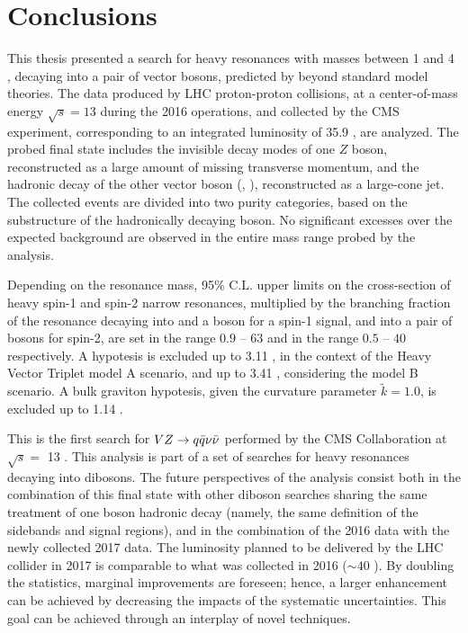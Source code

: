 \chapter{Conclusions}
\label{ch:conclusion}

This thesis presented a search for heavy resonances with masses between 1 \TeV and 4 \TeV, decaying into a pair of vector bosons, predicted by beyond standard model theories. The data produced by LHC proton-proton collisions, at a center-of-mass energy $\sqrt{s}=13$ \TeV during the 2016 operations, and collected by the CMS experiment, corresponding to an integrated luminosity of 35.9 \fbinv, are analyzed. The probed final state includes the invisible decay modes of one $Z$ boson, reconstructed as a large amount of missing transverse momentum, and the hadronic decay of the other vector boson (\Z, \W), reconstructed as a large-cone jet. The collected events are divided into two purity categories, based on the substructure of the hadronically decaying \V boson. No significant excesses over the expected background are observed in the entire mass range probed by the analysis.

\noindent Depending on the resonance mass, 95\% C.L. upper limits on the cross-section of heavy spin-1 and spin-2 narrow resonances, multiplied by the branching fraction of the resonance decaying into \Z and a \W boson for a spin-1 signal, and into a pair of \Z bosons for spin-2, are set in the range $0.9$ -- $63$ \fb and in the range $0.5$ -- $40$ \fb respectively. A \Wp hypotesis is excluded up to 3.11 \TeV, in the context of the Heavy Vector Triplet model A scenario, and up to 3.41 \TeV, considering the model B scenario. A bulk graviton hypotesis, given the curvature parameter $\tilde{k}=1.0$, is excluded up to 1.14 \TeV.

\vspace*{1\baselineskip}

\noindent This is the first search for $VZ \rightarrow q \bar{q} \nu \bar{\nu}$ performed by the CMS Collaboration at $\sqrt{s} = $ 13 \TeV. This analysis is part of a set of searches for heavy resonances decaying into dibosons. The future perspectives of the analysis consist both in the combination of this final state with other diboson searches sharing the same treatment of one boson hadronic decay (namely, the same definition of the sidebands and signal regions), and in the combination of the 2016 data with the newly collected 2017 data. The luminosity planned to be delivered by the LHC collider in 2017 is comparable to what was collected in 2016 ($\sim 40$ \fbinv). By doubling the statistics, marginal improvements are foreseen; hence, a larger enhancement can be achieved by decreasing the impacts of the systematic uncertainties. This goal can be achieved through an interplay of novel techniques.

